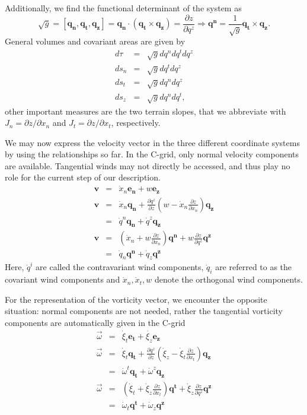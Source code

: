 Additionally, we find the functional determinant of the system as
\begin{displaymath}
 \sqrt{g}=[\mathbf{q_n},\mathbf{q_t},\mathbf{q_z}]=\mathbf{q_n}\cdot
(\mathbf{q_t}\times\mathbf{q_z})=\frac{\partial z}{\partial q^z}\Rightarrow \mathbf{q^n}=\frac{1}{\sqrt{g}}\mathbf{q_t}\times
\mathbf{q_z}.
\end{displaymath}
General volumes and covariant areas are given by
\begin{eqnarray*}
 d\tau &= &\sqrt{g}dq^ndq^tdq^z\\
 ds_n&=&\sqrt{g}dq^tdq^z\\
 ds_t&=&\sqrt{g}dq^ndq^z\\
 ds_z&=&\sqrt{g}dq^ndq^t,
\end{eqnarray*}
other important measures are the two terrain slopes, that we abbreviate with $J_n=\partial z/\partial x_n$ and $J_t=\partial z/\partial x_t$, respectively.

We may now express the velocity vector in the three different coordinate systems by using the relationships so far. In the C-grid, only normal velocity components are available. Tangential winds may not directly be accessed, and thus play no role for the current step of our description.
\begin{eqnarray*}
 \mathbf{v}&=&\dot{x}_n\mathbf{e_n}+w\mathbf{e_z}\\
 \mathbf{v}&=&\dot{x}_n\mathbf{q_n}+
              \frac{\partial q^z}{\partial z}(w-\dot{x}_n\frac{\partial z}{\partial x_n})\mathbf{q_z}\\
           &=&\dot{q}^n\mathbf{q_n}+\dot{q}^z\mathbf{q_z}\\
 \mathbf{v}&=&(\dot{x}_n+w\frac{\partial z}{\partial x_n})\mathbf{q^n}
              +w\frac{\partial z}{\partial q^z}\mathbf{q^z}\\
           &=&\dot{q}_n\mathbf{q^n}+\dot{q}_z\mathbf{q^z}
\end{eqnarray*}
Here, $\dot{q}^i$ are called the contravariant wind components,
$\dot{q}_i$ are referred to as the covariant wind components and
$\dot{x}_n,\dot{x}_t,w$ denote the orthogonal wind components.

For the representation of the vorticity vector, we encounter the opposite situation: normal components are not needed, rather the tangential vorticity components are automatically given in the C-grid
\begin{eqnarray*}
 \vec{\omega}&=&\dot{\xi}_t\mathbf{e_t}+\dot{\xi_z}\mathbf{e_z}\\
 \vec{\omega}&=&\dot{\xi}_t\mathbf{q_t}+
                \frac{\partial q^z}{\partial z}(\dot{\xi}_z
                -\dot{\xi}_t\frac{\partial z}{\partial x_t})\mathbf{q_z}\\
             &=&\dot{\omega}^t\mathbf{q_t}+\dot{\omega}^z\mathbf{q_z}\\
 \vec{\omega}&=&(\dot{\xi}_t+\dot{\xi}_z\frac{\partial z}{\partial x_t})\mathbf{q^t}
                +\dot{\xi}_z\frac{\partial z}{\partial q^z}\mathbf{q^z}\\
             &=&\dot{\omega}_t\mathbf{q^t}+\dot{\omega}_z\mathbf{q^z}
\end{eqnarray*}

